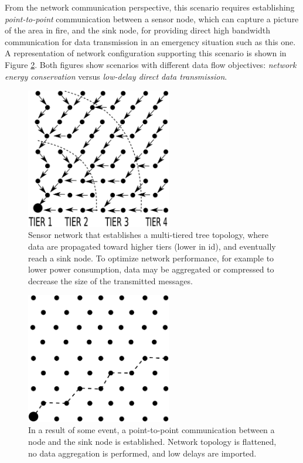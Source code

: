 From the network communication perspective, this scenario requires
establishing \textit{point-to-point} communication between a sensor node,
which can capture a picture of the area in fire, and the sink node, for 
providing direct high bandwidth communication for data transmission in an
emergency situation such as this one. A representation of network
configuration supporting this scenario is shown in Figure
\ref{fig:scenariob}. Both figures show scenarios with different data flow
objectives: \textit{network energy conservation} versus \textit{low-delay
direct data transmission}. 

\begin{figure}
\centering
	\includegraphics[width=2.5in]{fig/scenario_2a}
	\caption{Sensor network that establishes a multi-tiered tree
	topology, where data are propagated toward higher tiers (lower in
	id), and eventually reach a sink node. To optimize network
	performance, for example to lower power consumption, data may be
	aggregated or compressed to decrease the size of the transmitted
	messages.}
	\label{fig:scenarioa}
\end{figure}

\begin{figure}
\centering
	\includegraphics[width=2.5in]{fig/scenario_2b}
	\caption{In a result of some event, a point-to-point communication 
	between a node and the sink node is established. Network topology
	is flattened, no data aggregation is performed, and low delays are
	imported.}
	\label{fig:scenariob}
\end{figure}


